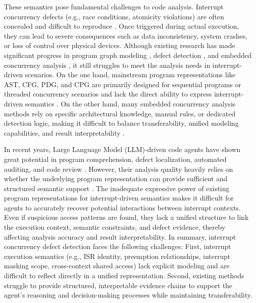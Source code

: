 \documentclass[a4paper,UKenglish,cleveref, autoref, thm-restate]{lipics-v2021}
\begin{document}
These semantics pose fundamental challenges to code analysis. Interrupt concurrency defects (e.g., race conditions, atomicity violations) are often concealed and difficult to reproduce \cite{li2023empirical}. Once triggered during actual execution, they can lead to severe consequences such as data inconsistency, system crashes, or loss of control over physical devices. Although existing research has made significant progress in program graph modeling \cite{yamaguchi2014modeling, mi2023graph, liu2023learning, shezan2023chkplug}, defect detection \cite{eslamimehr2018efficient, zhang2025effectively, qiu2024vulnerability, smaili2025transformer, ma2025value, wang2025sift}, and embedded concurrency analysis \cite{wang2017automatic, li2022precise, yu2023detecting, wang2022specchecker, wu2016static, zhang2025bounded, zhao2025formal, wu2015numerical, schwarz2011static, shi2015verifying, yu2018conpredictor, wang2020automatic, liang2017effective, ma2026integrating}, it still struggles to meet the analysis needs in interrupt-driven scenarios. On the one hand, mainstream program representations like AST, CFG, PDG, and CPG are primarily designed for sequential programs or threaded concurrency scenarios and lack the direct ability to express interrupt-driven semantics \cite{zhu2023code}. On the other hand, many embedded concurrency analysis methods rely on specific architectural knowledge, manual rules, or dedicated detection logic, making it difficult to balance transferability, unified modeling capabilities, and result interpretability \cite{feng2020rchecker, wang2025specchecker}.

In recent years, Large Language Model (LLM)-driven code agents have shown great potential in program comprehension, defect localization, automated auditing, and code review \cite{li2024enhancing, liu2025llm, wang2024llmdfa, nguyen2025empirical, li2025codedoctor, yu2024fine, nashaat2024towards}. However, their analysis quality heavily relies on whether the underlying program representation can provide sufficient and structured semantic support \cite{lekssays2025llmxcpg, shao2025graphfvd, peng2025keep}. The inadequate expressive power of existing program representations for interrupt-driven semantics makes it difficult for agents to accurately recover potential interactions between interrupt contexts. Even if suspicious access patterns are found, they lack a unified structure to link the execution context, semantic constraints, and defect evidence, thereby affecting analysis accuracy and result interpretability. In summary, interrupt concurrency defect detection faces the following challenges: First, interrupt execution semantics (e.g., ISR identity, preemption relationships, interrupt masking scope, cross-context shared access) lack explicit modeling and are difficult to reflect directly in a unified representation. Second, existing methods struggle to provide structured, interpretable evidence chains to support the agent's reasoning and decision-making processes while maintaining transferability.
\end{document}
